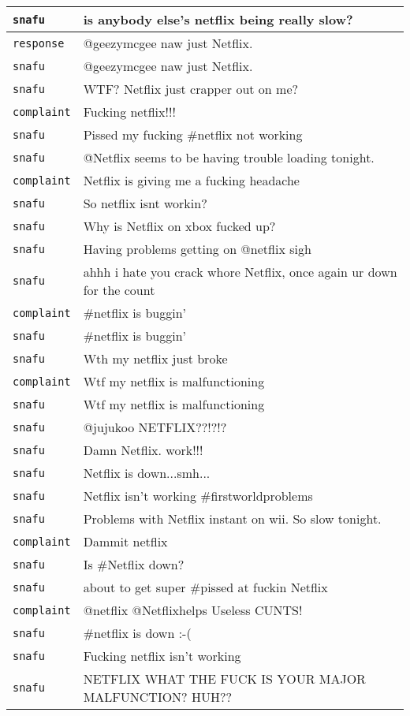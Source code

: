 {\begin{longtable}{|l|p{160mm}|}
      \tabularnewline\hline
         \texttt{snafu} & is anybody else's netflix being really slow?
      \tabularnewline\hline
         \texttt{response} & @geezymcgee naw just Netflix.
      \tabularnewline\hline
         \texttt{snafu} & @geezymcgee naw just Netflix.
      \tabularnewline\hline
         \texttt{snafu} & WTF? Netflix just crapper out on me?
      \tabularnewline\hline
         \texttt{complaint} & Fucking netflix!!!
      \tabularnewline\hline
         \texttt{snafu} & Pissed my fucking \#netflix not working
      \tabularnewline\hline
         \texttt{snafu} & @Netflix seems to be having trouble loading tonight.
      \tabularnewline\hline
         \texttt{complaint} & Netflix is giving me a fucking headache
      \tabularnewline\hline
         \texttt{snafu} & So netflix isnt workin?
      \tabularnewline\hline
         \texttt{snafu} & Why is Netflix on xbox fucked up?
      \tabularnewline\hline
         \texttt{snafu} & Having problems getting on @netflix sigh
      \tabularnewline\hline
         \texttt{snafu} & ahhh i hate you crack whore Netflix, once again ur down for the count
      \tabularnewline\hline
         \texttt{complaint} & \#netflix is buggin'
      \tabularnewline\hline
         \texttt{snafu} & \#netflix is buggin'
      \tabularnewline\hline
         \texttt{snafu} & Wth my netflix just broke
      \tabularnewline\hline
         \texttt{complaint} & Wtf my netflix is malfunctioning
      \tabularnewline\hline
         \texttt{snafu} & Wtf my netflix is malfunctioning
      \tabularnewline\hline
         \texttt{snafu} & @jujukoo NETFLIX??!?!?
      \tabularnewline\hline
         \texttt{snafu} & Damn Netflix. work!!!
      \tabularnewline\hline
         \texttt{snafu} & Netflix is down...smh...
      \tabularnewline\hline
         \texttt{snafu} & Netflix isn't working \#firstworldproblems
      \tabularnewline\hline
         \texttt{snafu} & Problems with Netflix instant on wii. So slow tonight.
      \tabularnewline\hline
         \texttt{complaint} & Dammit netflix
      \tabularnewline\hline
         \texttt{snafu} & Is \#Netflix down?
      \tabularnewline\hline
         \texttt{snafu} & about to get super \#pissed at fuckin Netflix
      \tabularnewline\hline
         \texttt{complaint} & @netflix @Netflixhelps Useless CUNTS!
      \tabularnewline\hline
         \texttt{snafu} & \#netflix is down :-(
      \tabularnewline\hline
         \texttt{snafu} & Fucking netflix isn't working
      \tabularnewline\hline
         \texttt{snafu} & NETFLIX WHAT THE FUCK IS YOUR MAJOR MALFUNCTION? HUH??
      \tabularnewline\hline

\end{longtable}}
